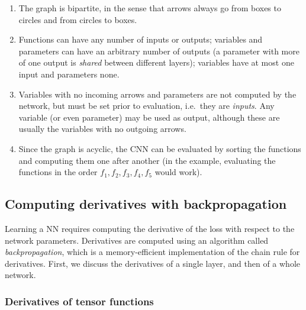 \begin{enumerate}
	\item The graph is bipartite, in the sense that arrows always go from boxes to circles and from circles to boxes. 
	\item Functions can have any number of inputs or outputs; variables and parameters can have an arbitrary number of outputs (a parameter with more of one output is \emph{shared} between different layers); variables have at most one input and parameters none. 
	\item Variables with no incoming arrows and parameters are not computed by the network, but must be set prior to evaluation, i.e.\ they are \emph{inputs}. Any variable (or even parameter) may be used as output, although these are usually the variables with no outgoing arrows.
	\item Since the graph is acyclic, the CNN can be evaluated by sorting the functions and computing them one after another (in the example, evaluating the functions in the order $f_1,f_2,f_3,f_4,f_5$ would work).
\end{enumerate}

\subsection{Computing derivatives with backpropagation}\label{s:back}

Learning a NN requires computing the derivative of the loss with respect to the network parameters. Derivatives are computed using an algorithm called \emph{backpropagation}, which is a memory-efficient implementation of the chain rule for derivatives. First, we discuss the derivatives of a single layer, and then of a whole network.

\subsubsection{Derivatives of tensor functions}

